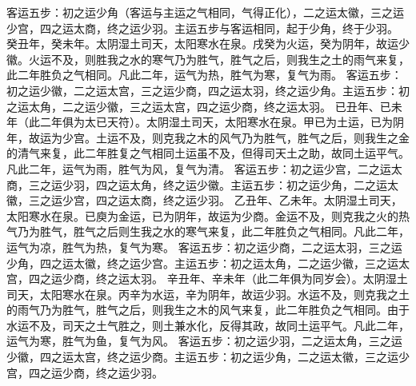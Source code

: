 \documentclass[12pt,UTF8]{ctexbook}
\begin{document}
客运五步：初之运少角（客运与主运之气相同，气得正化），二之运太徽，三之运少宫，四之运太商，终之运少羽。主运五步与客运相同，起于少角，终于少羽。
癸丑年，癸未年。太阴湿土司天，太阳寒水在泉。戌癸为火运，癸为阴年，故运少徽。火运不及，则胜我之水的寒气乃为胜气，胜气之后，则我生之土的雨气来复，此二年胜负之气相同。凡此二年，运气为热，胜气为寒，复气为雨。
客运五步：初之运少徽，二之运太宫，三之运少商，四之运太羽，终之运少角。主运五步：初之运太角，二之运少徽，三之运太宫，四之运少商，终之运太羽。
已丑年、已未年（此二年俱为太已天符）。太阴湿土司天，太阳寒水在泉。甲已为土运，已为阴年，故运为少宫。土运不及，则克我之木的风气乃为胜气，胜气之后，则我生之金的清气来复，此二年胜复之气相同土运虽不及，但得司天土之助，故同土运平气。凡此二年，运气为雨，胜气为风，复气为清。
客运五步：初之运少宫，二之运太商，三之运少羽，四之运太角，终之运少徽。主运五步：初之运少角，二之运太徽，三之运少宫，四之运太商，终之运少羽。
乙丑年、乙未年。太阴湿土司天，太阳寒水在泉。已庾为金运，已为阴年，故运为少商。金运不及，则克我之火的热气乃为胜气，胜气之后则生我之水的寒气来复，此二年胜负之气相同。凡此二年，运气为凉，胜气为热，复气为寒。
客运五步：初之运少商，二之运太羽，三之运少角，四之运太徽，终之运少宫。主运五步：初之运太角，二之运少徽，三之运太宫，四之运少商，终之运太羽。
辛丑年、辛未年（此二年俱为同岁会）。太阴湿土司天，太阳寒水在泉。丙辛为水运，辛为阴年，故运少羽。水运不及，则克我之土的雨气乃为胜气，胜气之后，则我生之木的风气来复，此二年胜负之气相同。由于水运不及，司天之土气胜之，则土兼水化，反得其政，故同土运平气。凡此二年，运气为寒，胜气为鱼，复气为风。
客运五步：初之运少羽，二之运太角，三之运少徽，四之运太宫，终之运少商。主运五步：初之运少角，二之运太徽，三之运少宫，四之运少商，终之运少羽。
\end{document}
